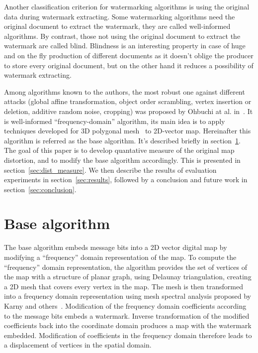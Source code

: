 \documentclass{article}
\begin{document}
Another classification criterion for watermarking algorithms is using the original data during watermark extracting. 
Some watermarking algorithms need the original document to extract the watermark, they are called well-informed algorithms. 
By contrast, those not using the original document to extract the watermark are called blind.
Blindness is an interesting property in case of huge and on the fly production of different documents 
as it doesn't oblige the producer to store every original document, but on the other hand it reduces a possibility of watermark extracting.

Among algorithms known to the authors, the most robust one against different attacks (global affine transformation, object order scrambling, 
vertex insertion or deletion, additive random noise, cropping) was proposed by Ohbuchi at al. in~\cite{Ohbuchi}. It is well-informed ``frequency-domain'' algorithm, 
its main idea is to apply techniques developed for 3D polygonal mesh~\cite{Ohbuchi3D} to 2D-vector map. 
Hereinafter this algorithm is referred as the base algorithm. It's described briefly in section~\ref{sec:base}. 
The goal of this paper is to develop quantative measure of the original map distortion, and to modify the base algorithm accordingly.
This is presented in section~\ref{sec:dist_measure}. We then describe the results of evaluation experiments in section~\ref{sec:results}, 
followed by a conclusion and future work in section~\ref{sec:conclusion}.

\section{Base algorithm}
\label{sec:base}
The base algorithm embeds message bits into a 2D vector digital map by modifying a ``frequency'' domain representation of the map. 
To compute the ``frequency'' domain representation, the algorithm provides the set of vertices of the map with a structure of planar graph, using Delaunay triangulation, creating a 2D mesh that covers every vertex in the map.
The mesh is then transformed into a frequency domain representation using mesh spectral analysis proposed by Karny and others~\cite{Karni1, Karni2}. Modification of the frequency domain coefficients 
according to the message bits embeds a watermark. Inverse transformation of the modified coefficients back into the coordinate domain produces a map with the watermark embedded. Modification of coefficients in the
frequency domain therefore leads to a displacement of vertices in the spatial domain.
\end{document}
